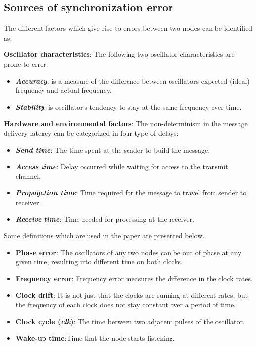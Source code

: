 \documentclass[journal]{IEEEtran}
\begin{document}
\subsection{\textbf{Sources of synchronization error}}
The different factors which give rise to errors between two nodes can be identified as:\par \noindent
\textbf{Oscillator characteristics}: The following two oscillator characteristics are prone to error.
         \begin{itemize}
         \item \emph{\textbf{Accuracy}}: is a measure of the difference between oscillators expected (ideal)
           frequency and actual frequency.
         \item \emph{\textbf{Stability}}: is oscillator's tendency to stay at the same frequency over
           time.
      \end{itemize}
\textbf{Hardware and environmental factors}: The non-determinism in the message delivery latency can be categorized in four type of delays:
      \begin{itemize}
         \item \emph{\textbf{Send time}}: The time spent at the sender to build the message.
         \item \emph{\textbf{Access time}}: Delay occurred while waiting for access to the transmit channel.
         \item \emph{\textbf{Propagation time}}: Time required for the message to travel from sender to receiver.
         \item \emph{\textbf{Receive time}}: Time needed for processing at the receiver.
      \end{itemize}
Some definitions which are used in the paper are presented below.
\begin{itemize}
\item \textbf{Phase error}: The oscillators of any two nodes can be out of phase at any given time, resulting into different time on both clocks.
\item \textbf{Frequency error}: Frequency error measures the difference in the clock rates.
\item \textbf{Clock drift}: It is not just that the clocks are running at different rates, but the frequency of each clock does not stay constant over a period of time.
\item \textbf{Clock cycle (\textit{clk})}: The time between two adjacent pulses of the oscillator.
\item \textbf{Wake-up time}:Time that the node starts listening.
\end{itemize}
\end{document}
